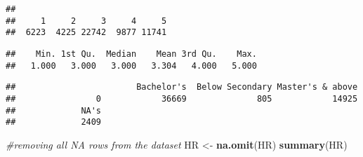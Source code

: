 \documentclass[
]{article}
\newenvironment{Shaded}{\begin{snugshade}}{\end{snugshade}}
\newcommand{\CommentTok}[1]{\textcolor[rgb]{0.56,0.35,0.01}{\textit{#1}}}
\newcommand{\KeywordTok}[1]{\textcolor[rgb]{0.13,0.29,0.53}{\textbf{#1}}}
\newcommand{\NormalTok}[1]{#1}
\newcommand{\OperatorTok}[1]{\textcolor[rgb]{0.81,0.36,0.00}{\textbf{#1}}}
\newcommand{\OtherTok}[1]{\textcolor[rgb]{0.56,0.35,0.01}{#1}}
\newcommand{\StringTok}[1]{\textcolor[rgb]{0.31,0.60,0.02}{#1}}
\begin{document}
\begin{verbatim}
## 
##     1     2     3     4     5 
##  6223  4225 22742  9877 11741
\end{verbatim}

\begin{Shaded}
\end{Shaded}

\begin{verbatim}
##    Min. 1st Qu.  Median    Mean 3rd Qu.    Max. 
##   1.000   3.000   3.000   3.304   4.000   5.000
\end{verbatim}

\begin{Shaded}
\end{Shaded}

\begin{verbatim}
##                        Bachelor's  Below Secondary Master's & above 
##                0            36669              805            14925 
##             NA's 
##             2409
\end{verbatim}

\begin{Shaded}
\begin{Highlighting}[]
\CommentTok{#removing all NA rows from the dataset}
\NormalTok{HR <-}\StringTok{ }\KeywordTok{na.omit}\NormalTok{(HR)}
\KeywordTok{summary}\NormalTok{(HR)}
\end{Highlighting}
\end{Shaded}
\end{document}
